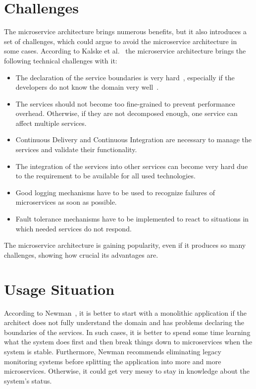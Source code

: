 \section{Challenges} \label{sec:microservice_challenges}
The microservice architecture brings numerous benefits, but it also introduces a set of challenges, which could argue to avoid the microservice architecture in some cases.
According to Kalske et al.~\cite{kalske2017challenges} the microservice architecture brings the following technical challenges with it: 
\begin{itemize}
    \item The declaration of the service boundaries is very hard~\cite{kalske2017challenges}, especially if the developers do not know the domain very well~\cite{newman2021building}.
    \item The services should not become too fine-grained to prevent performance overhead.
		Otherwise, if they are not decomposed enough, one service can affect multiple services.
    \item Continuous Delivery and Continuous Integration are necessary to manage the services and validate their functionality.
    \item The integration of the services into other services can become very hard due to the requirement to be available for all used technologies.
    \item Good logging mechanisms have to be used to recognize failures of microservices as soon as possible.
    \item Fault tolerance mechanisms have to be implemented to react to situations in which needed services do not respond.
\end{itemize}
The microservice architecture is gaining popularity, even if it produces so many challenges, showing how crucial its advantages are.

\section{Usage Situation}
According to Newman~\cite{newman2021building}, it is better to start with a monolithic application if the architect does not fully understand the domain and has problems declaring the boundaries of the services.
In such cases, it is better to spend some time learning what the system does first and then break things down to microservices when the system is stable.
Furthermore, Newman recommends eliminating legacy monitoring systems before splitting the application into more and more microservices.
Otherwise, it could get very messy to stay in knowledge about the system's status.

